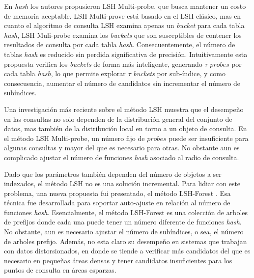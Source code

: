  En \textit{hash} los autores propusieron LSH Multi-probe, que busca mantener un costo de memoria aceptable. LSH Multi-prove está basado en el LSH clásico, mas en cuanto el algoritmo de consulta LSH examina apenas un \textit{bucket} para cada tabla \textit{hash}, LSH Muli-probe examina los \textit{buckets} que son susceptibles de contener los resultados de consulta por cada tabla \textit{hash}. Consecuentemente, el número de tablas \textit{hash} es reducido sin perdida significativa de precisión. Intuitivamente esta propuesta verifica los \textit{buckets} de forma más inteligente, generando $\tau$ $probes$ por cada tabla   \textit{hash}, lo que permite explorar $\tau$ \textit{buckets} por sub-índice, y como consecuencia, aumentar el número de candidatos sin incrementar el número de subíndices.

Una investigación más reciente sobre el método LSH \cite{modelinglsh}  muestra que el desempeño en las consultas no solo dependen de la distribución general del conjunto de datos, mas también de la distribución local en torno a un objeto de consulta. En el método LSH Multi-probe, un número fijo de $probes$ puede ser insuficiente para algunas consultas y mayor del que es necesario para otras. No obstante aun es complicado ajustar el número de funciones \textit{hash} asociado al radio de consulta.

Dado que los parámetros también dependen del número de objetos a ser indexados, el método LSH no es una solución incremental. Para lidiar con este problema, una nueva propuesta fui presentado, el método LSH-Forest \cite{lshforest}. Esa técnica fue desarrollada para soportar auto-ajuste en relación al número de funciones \textit{hash}. Esencialmente, el método LSH-Forest es una colección de arboles de prefijos donde cada una puede tener un número diferente de funciones \textit{hash}. No obstante, aun es necesario ajustar el número de subíndices, o sea, el número de arboles prefijo. Además, no esta claro su desempeño en sistemas que trabajan con datos distorsionados, en donde se tiende a verificar más candidatos del que es necesario en pequeñas áreas densas y tener candidatos insuficientes para los puntos de consulta en áreas esparzas.


